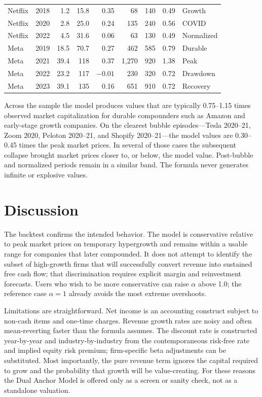 \documentclass[11pt]{article}
\begin{document}
\begin{longtable}{@{}llrrrrrrl@{}}
Netflix & 2018 & 1.2 & 15.8 & 0.35 & 68 & 140 & 0.49 & Growth \\
Netflix & 2020 & 2.8 & 25.0 & 0.24 & 135 & 240 & 0.56 & COVID \\
Netflix & 2022 & 4.5 & 31.6 & 0.06 & 63 & 130 & 0.49 & Normalized \\
Meta & 2019 & 18.5 & 70.7 & 0.27 & 462 & 585 & 0.79 & Durable \\
Meta & 2021 & 39.4 & 118 & 0.37 & 1{,}270 & 920 & 1.38 & Peak \\
Meta & 2022 & 23.2 & 117 & $-0.01$ & 230 & 320 & 0.72 & Drawdown \\
Meta & 2023 & 39.1 & 135 & 0.16 & 651 & 910 & 0.72 & Recovery \\
\bottomrule
\end{longtable}

Across the sample the model produces values that are typically 0.75--1.15 times observed market capitalization for durable compounders such as Amazon and early-stage growth companies. On the clearest bubble episodes---Tesla 2020--21, Zoom 2020, Peloton 2020--21, and Shopify 2020--21---the model values are 0.30--0.45 times the peak market prices. In several of those cases the subsequent collapse brought market prices closer to, or below, the model value. Post-bubble and normalized periods remain in a similar band. The formula never generates infinite or explosive values.

\section{Discussion}
The backtest confirms the intended behavior. The model is conservative relative to peak market prices on temporary hypergrowth and remains within a usable range for companies that later compounded. It does not attempt to identify the subset of high-growth firms that will successfully convert revenue into sustained free cash flow; that discrimination requires explicit margin and reinvestment forecasts. Users who wish to be more conservative can raise \(\alpha\) above 1.0; the reference case \(\alpha = 1\) already avoids the most extreme overshoots.

Limitations are straightforward. Net income is an accounting construct subject to non-cash items and one-time charges. Revenue growth rates are noisy and often mean-reverting faster than the formula assumes. The discount rate is constructed year-by-year and industry-by-industry from the contemporaneous risk-free rate and implied equity risk premium; firm-specific beta adjustments can be substituted. Most importantly, the pure revenue term ignores the capital required to grow and the probability that growth will be value-creating. For these reasons the Dual Anchor Model is offered only as a screen or sanity check, not as a standalone valuation.
\end{document}
